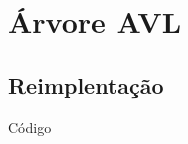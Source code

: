 \section{Árvore AVL}
\subsection{Reimplentação}

{Código}
\begin{multicols}{2}

	\label{cod:ex11.h}
\end{multicols}

\vspace{12pt} 

\begin{multicols}{2}

	\label{cod:ex11.c}
\end{multicols}

\vspace{12pt} 

\begin{multicols}{2}

	\label{cod:main_q11.c}
\end{multicols}

\vspace{12pt} 

\begin{multicols}{2}

	\label{cod:Makefile_q11}
\end{multicols}



\clearpage

